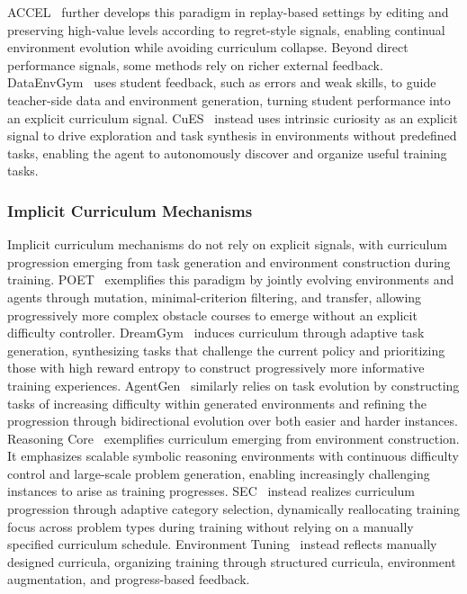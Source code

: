 ACCEL~\cite{ACCEL} further develops this paradigm in replay-based settings by editing and preserving high-value levels according to regret-style signals, enabling continual environment evolution while avoiding curriculum collapse.
%
Beyond direct performance signals, some methods rely on richer external feedback.
DataEnvGym~\cite{DataEnvGym} uses student feedback, such as errors and weak skills, to guide teacher-side data and environment generation, turning student performance into an explicit curriculum signal.
CuES~\cite{CuES} instead uses intrinsic curiosity as an explicit signal to drive exploration and task synthesis in environments without predefined tasks, enabling the agent to autonomously discover and organize useful training tasks.  
%
\subsubsection{Implicit Curriculum Mechanisms}\label{sec:Implicit Curriculum Mechanisms}
Implicit curriculum mechanisms do not rely on explicit signals, with curriculum progression emerging from task generation and environment construction during training.
%
POET~\cite{POET} exemplifies this paradigm by jointly evolving environments and agents through mutation, minimal-criterion filtering, and transfer, allowing progressively more complex obstacle courses to emerge without an explicit difficulty controller.
DreamGym~\cite{DreamGym} induces curriculum through adaptive task generation, synthesizing tasks that challenge the current policy and prioritizing those with high reward entropy to construct progressively more informative training experiences.
AgentGen~\cite{AgentGen} similarly relies on task evolution by constructing tasks of increasing difficulty within generated environments and refining the progression through bidirectional evolution over both easier and harder instances.
%
Reasoning Core~\cite{Reasoning_Core} exemplifies curriculum emerging from environment construction. It emphasizes scalable symbolic reasoning environments with continuous difficulty control and large-scale problem generation, enabling increasingly challenging instances to arise as training progresses.
%
SEC~\cite{SEC} instead realizes curriculum progression through adaptive category selection, dynamically reallocating training focus across problem types during training without relying on a manually specified curriculum schedule.
%
Environment Tuning~\cite{Environment_Tuning} instead reflects manually designed curricula, organizing training through structured curricula, environment augmentation, and progress-based feedback.
%


